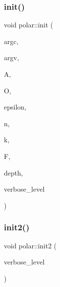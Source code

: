 \mbox{\label{classpolar_a5cbd03feabd36e3bc7505b65a71fe7a9}} 
\subsubsection{\texorpdfstring{init()}{init()}}
{\footnotesize\ttfamily void polar\+::init (\begin{DoxyParamCaption}\item[{int}]{argc,  }\item[{const char $\ast$$\ast$}]{argv,  }\item[{\mbox{\hyperlink{classaction}{action}} $\ast$}]{A,  }\item[{\mbox{\hyperlink{classorthogonal}{orthogonal}} $\ast$}]{O,  }\item[{\mbox{\hyperlink{galois_8h_a09fddde158a3a20bd2dcadb609de11dc}{I\+NT}}}]{epsilon,  }\item[{\mbox{\hyperlink{galois_8h_a09fddde158a3a20bd2dcadb609de11dc}{I\+NT}}}]{n,  }\item[{\mbox{\hyperlink{galois_8h_a09fddde158a3a20bd2dcadb609de11dc}{I\+NT}}}]{k,  }\item[{\mbox{\hyperlink{classfinite__field}{finite\+\_\+field}} $\ast$}]{F,  }\item[{\mbox{\hyperlink{galois_8h_a09fddde158a3a20bd2dcadb609de11dc}{I\+NT}}}]{depth,  }\item[{\mbox{\hyperlink{galois_8h_a09fddde158a3a20bd2dcadb609de11dc}{I\+NT}}}]{verbose\+\_\+level }\end{DoxyParamCaption})}

\mbox{\label{classpolar_adfb0b408d3e1b033c59ea1da4b832ba0}} 
\subsubsection{\texorpdfstring{init2()}{init2()}}
{\footnotesize\ttfamily void polar\+::init2 (\begin{DoxyParamCaption}\item[{\mbox{\hyperlink{galois_8h_a09fddde158a3a20bd2dcadb609de11dc}{I\+NT}}}]{verbose\+\_\+level }\end{DoxyParamCaption})}

\mbox{\label{classpolar_a72edbe4cf3d44b38de4038fa89270c69}} 
